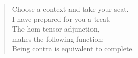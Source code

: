
\thispagestyle{plain}

\vspace*{7cm}
\begin{verse}
    \hspace{8em}Choose a context and take your seat. \\
    \vspace{5pt}
    \hspace{8em}I have prepared for you a treat. \\
    \vspace{5pt}
    \hspace{8em}The hom-tensor adjunction, \\
    \vspace{5pt}
    \hspace{8em}makes the following function: \\
    \vspace{5pt}
    \hspace{8em}Being contra is equivalent to complete. 

\end{verse}